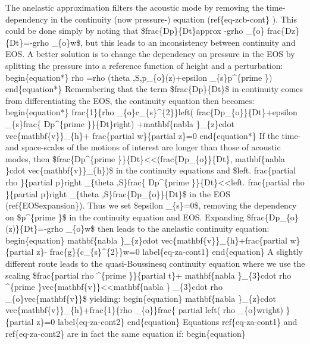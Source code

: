 \documentclass[letterpaper,10pt,english]{sphinxmanual}
\begin{document}
The anelastic approximation filters the acoustic mode by removing the
time-dependency in the continuity (now pressure-) equation (ref\{eq-zcb-cont\}
). This could be done simply by noting that \$frac\{Dp\}\{Dt\}approx -grho \_\{o\}
frac\{Dz\}\{Dt\}=-grho \_\{o\}w\$, but this leads to an inconsistency between
continuity and EOS. A better solution is to change the dependency on
pressure in the EOS by splitting the pressure into a reference function of
height and a perturbation:
begin\{equation*\}
rho =rho (theta ,S,p\_\{o\}(z)+epsilon \_\{s\}p\textasciicircum{}\{prime \})
end\{equation*\}
Remembering that the term \$frac\{Dp\}\{Dt\}\$ in continuity comes from
differentiating the EOS, the continuity equation then becomes:
begin\{equation*\}
frac\{1\}\{rho \_\{o\}c\_\{s\}\textasciicircum{}\{2\}\}left( frac\{Dp\_\{o\}\}\{Dt\}+epsilon \_\{s\}frac\{
Dp\textasciicircum{}\{prime \}\}\{Dt\}right) +mathbf\{nabla \}\_\{z\}cdot vec\{mathbf\{v\}\}\_\{h\}+
frac\{partial w\}\{partial z\}=0
end\{equation*\}
If the time- and space-scales of the motions of interest are longer than
those of acoustic modes, then \$frac\{Dp\textasciicircum{}\{prime \}\}\{Dt\}\textless{}\textless{}(frac\{Dp\_\{o\}\}\{Dt\},
mathbf\{nabla \}cdot vec\{mathbf\{v\}\}\_\{h\})\$ in the continuity equations and
\$left. frac\{partial rho \}\{partial p\}right\textbar{} \_\{theta ,S\}frac\{
Dp\textasciicircum{}\{prime \}\}\{Dt\}\textless{}\textless{}left. frac\{partial rho \}\{partial p\}right\textbar{} \_\{theta
,S\}frac\{Dp\_\{o\}\}\{Dt\}\$ in the EOS (ref\{EOSexpansion\}). Thus we set \$epsilon
\_\{s\}=0\$, removing the dependency on \$p\textasciicircum{}\{prime \}\$ in the continuity equation
and EOS. Expanding \$frac\{Dp\_\{o\}(z)\}\{Dt\}=-grho \_\{o\}w\$ then leads to the
anelastic continuity equation:
begin\{equation\}
mathbf\{nabla \}\_\{z\}cdot vec\{mathbf\{v\}\}\_\{h\}+frac\{partial w\}\{partial z\}-
frac\{g\}\{c\_\{s\}\textasciicircum{}\{2\}\}w=0  label\{eq-za-cont1\}
end\{equation\}
A slightly different route leads to the quasi-Boussinesq continuity equation
where we use the scaling \$frac\{partial rho \textasciicircum{}\{prime \}\}\{partial t\}+
mathbf\{nabla \}\_\{3\}cdot rho \textasciicircum{}\{prime \}vec\{mathbf\{v\}\}\textless{}\textless{}mathbf\{nabla \}
\_\{3\}cdot rho \_\{o\}vec\{mathbf\{v\}\}\$ yielding:
begin\{equation\}
mathbf\{nabla \}\_\{z\}cdot vec\{mathbf\{v\}\}\_\{h\}+frac\{1\}\{rho \_\{o\}\}frac\{
partial left( rho \_\{o\}wright) \}\{partial z\}=0  label\{eq-za-cont2\}
end\{equation\}
Equations ref\{eq-za-cont1\} and ref\{eq-za-cont2\} are in fact the same
equation if:
begin\{equation\}
\end{document}
